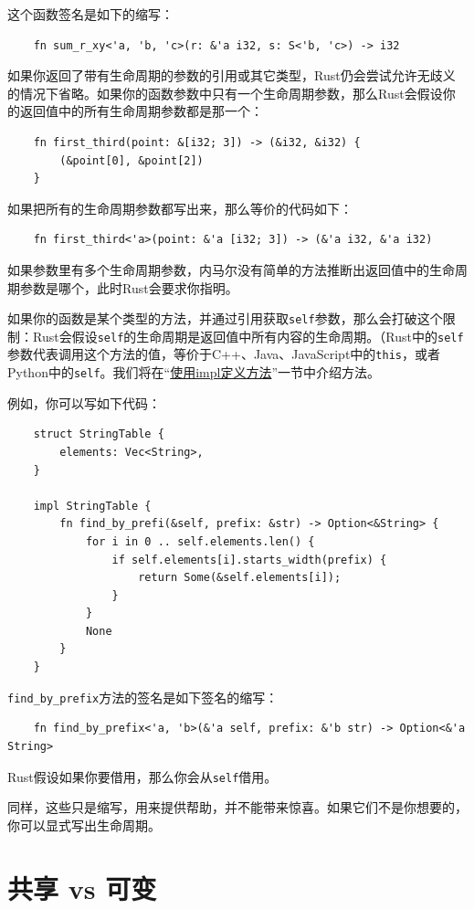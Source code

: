 这个函数签名是如下的缩写：
\begin{verbatim}
    fn sum_r_xy<'a, 'b, 'c>(r: &'a i32, s: S<'b, 'c>) -> i32
\end{verbatim}

如果你返回了带有生命周期的参数的引用或其它类型，Rust仍会尝试允许无歧义的情况下省略。如果你的函数参数中只有一个生命周期参数，那么Rust会假设你的返回值中的所有生命周期参数都是那一个：
\begin{verbatim}
    fn first_third(point: &[i32; 3]) -> (&i32, &i32) {
        (&point[0], &point[2])
    }
\end{verbatim}

如果把所有的生命周期参数都写出来，那么等价的代码如下：
\begin{verbatim}
    fn first_third<'a>(point: &'a [i32; 3]) -> (&'a i32, &'a i32)
\end{verbatim}

如果参数里有多个生命周期参数，内马尔没有简单的方法推断出返回值中的生命周期参数是哪个，此时Rust会要求你指明。

如果你的函数是某个类型的方法，并通过引用获取\texttt{self}参数，那么会打破这个限制：Rust会假设\texttt{self}的生命周期是返回值中所有内容的生命周期。（Rust中的\texttt{self}参数代表调用这个方法的值，等价于C++、Java、JavaScript中的\texttt{this}，或者Python中的\texttt{self}。我们将在“\hyperref[method]{使用impl定义方法}”一节中介绍方法。

例如，你可以写如下代码：
\begin{verbatim}
    struct StringTable {
        elements: Vec<String>,
    }

    impl StringTable {
        fn find_by_prefi(&self, prefix: &str) -> Option<&String> {
            for i in 0 .. self.elements.len() {
                if self.elements[i].starts_width(prefix) {
                    return Some(&self.elements[i]);
                }
            }
            None
        }
    }
\end{verbatim}

\texttt{find\_by\_prefix}方法的签名是如下签名的缩写：
\begin{verbatim}
    fn find_by_prefix<'a, 'b>(&'a self, prefix: &'b str) -> Option<&'a String>
\end{verbatim}
Rust假设如果你要借用，那么你会从\texttt{self}借用。

同样，这些只是缩写，用来提供帮助，并不能带来惊喜。如果它们不是你想要的，你可以显式写出生命周期。

\section{共享 vs 可变}


